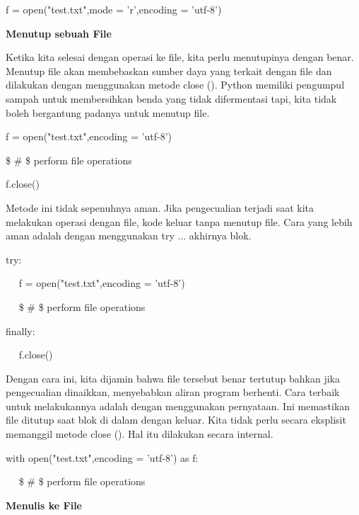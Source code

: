 \vspace{12pt}
\noindent 
f = open("test.txt",mode = 'r',encoding = 'utf-8') \par
\vspace{12pt}
\noindent 
{\fontsize{14pt}{14pt}\selectfont \textbf{Menutup sebuah File} \\} \par
Ketika kita selesai dengan operasi ke file, kita perlu menutupinya dengan benar. Menutup file akan membebaskan sumber daya yang terkait dengan file dan dilakukan dengan menggunakan metode close (). Python memiliki pengumpul sampah untuk membersihkan benda yang tidak difermentasi tapi, kita tidak boleh bergantung padanya untuk menutup file. \par
\noindent 
f = open("test.txt",encoding = 'utf-8') \par
\noindent 
 \$  \#  \$ perform file operations \par
\noindent 
f.close() \par
\vspace{12pt}
\noindent 
Metode ini tidak sepenuhnya aman. Jika pengecualian terjadi saat kita melakukan operasi dengan file, kode keluar tanpa menutup file. Cara yang lebih aman adalah dengan menggunakan try ... akhirnya blok. \par
\vspace{12pt}
\noindent 
try: \par
\noindent 
~~ f = open("test.txt",encoding = 'utf-8') \par
\noindent 
~~  \$  \#  \$ perform file operations \par
\noindent 
finally: \par
\noindent 
~~ f.close() \par
\vspace{12pt}
Dengan cara ini, kita dijamin bahwa file tersebut benar tertutup bahkan jika pengecualian dinaikkan, menyebabkan aliran program berhenti. Cara terbaik untuk melakukannya adalah dengan menggunakan pernyataan. Ini memastikan file ditutup saat blok di dalam dengan keluar. Kita tidak perlu secara eksplisit memanggil metode close (). Hal itu dilakukan secara internal. \par
\vspace{12pt}
\noindent 
with open("test.txt",encoding = 'utf-8') as f: \par
\noindent 
~~  \$  \#  \$ perform file operations \par
\vspace{12pt}
\noindent 
{\fontsize{14pt}{14pt}\selectfont \textbf{Menulis ke File} \\} \par
